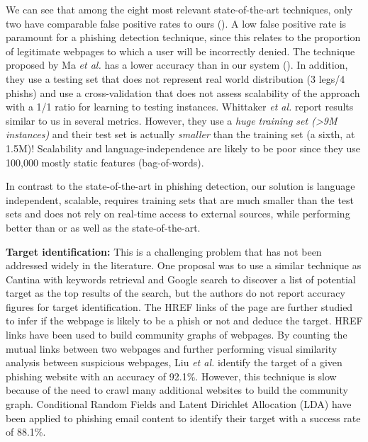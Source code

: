 \documentclass[10pt,conference,compsocconf,letterpaper]{IEEEtran}
\begin{document}
We can see that among the eight most relevant state-of-the-art techniques, only two \cite{Ma:2009:beyond,whittaker:2010:large} have comparable false positive rates to ours (). A low false positive rate is paramount for a phishing detection technique, since this relates to the proportion of legitimate webpages to which a user will be incorrectly denied.
The technique proposed by Ma \textit{et al.} \cite{Ma:2009:beyond} has a lower accuracy than in our system (). In addition, they use a testing set that does not represent real world distribution (3 legs/4 phishs) and use a cross-validation that does not assess scalability of the approach with a 1/1 ratio for learning to testing instances. 
Whittaker \textit{et al.} \cite{whittaker:2010:large} report results similar to us in several metrics. However, they use a \emph{huge training set (\textgreater 9M instances)} and their test set is actually \emph{smaller} than the training set (a sixth, at 1.5M)! Scalability and language-independence are likely to be poor since they use 100,000 mostly static features (bag-of-words).


In contrast to the state-of-the-art in phishing detection, our solution is language independent, scalable, requires training sets that are much smaller than the test sets and does not rely on real-time access to external sources, while performing better than or as well as the state-of-the-art.



\iftargetid
\textbf{Target identification:}
This is a challenging problem that has not been addressed widely in the literature. One proposal \cite{ramesh:2014:efficious} was to use a similar technique as Cantina with keywords retrieval and Google search to discover a list of potential target as the top results of the search, but the authors do not report accuracy figures for target identification.
\iffullversion
The HREF links of the page are further studied to infer if the webpage is likely to be a phish or not and deduce the target. 
\fi
HREF links have been used to build community graphs of webpages. By counting the mutual links between two webpages and further performing visual similarity analysis between suspicious webpages, Liu \textit{et al.} \cite{liu:2012:anti} identify the target of a given phishing website with an accuracy of 92.1\%. However, this technique is slow because of the need to crawl many additional websites to build the community graph.
Conditional Random Fields and Latent Dirichlet Allocation (LDA) \cite{blei:2003:latent} have been applied to phishing email content to identify their target \cite{ramanathan:2013:phishing} with a success rate of 88.1\%.
\end{document}
